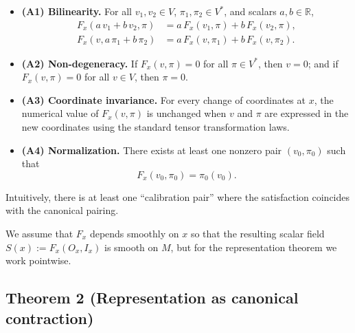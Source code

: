 \documentclass[12pt]{article}
\theoremstyle{remark}
\begin{document}
\begin{itemize}
    \item \textbf{(A1) Bilinearity.} For all $v_1, v_2 \in V$, $\pi_1, \pi_2 \in V^*$, and scalars $a, b \in \mathbb{R}$,
    \begin{align}
        F_x(a\, v_1 + b\, v_2, \pi) &= a\, F_x(v_1, \pi) + b\, F_x(v_2, \pi),\\
        F_x(v, a\, \pi_1 + b\, \pi_2) &= a\, F_x(v, \pi_1) + b\, F_x(v, \pi_2).
    \end{align}

    \item \textbf{(A2) Non-degeneracy.} If $F_x(v, \pi) = 0$ for all $\pi \in V^*$, then $v = 0$; and if $F_x(v, \pi) = 0$ for all $v \in V$, then $\pi = 0$.

    \item \textbf{(A3) Coordinate invariance.} For every change of coordinates at $x$, the numerical value of $F_x(v, \pi)$ is unchanged when $v$ and $\pi$ are expressed in the new coordinates using the standard tensor transformation laws.

    \item \textbf{(A4) Normalization.} There exists at least one nonzero pair $(v_0, \pi_0)$ such that
    \begin{equation}
        F_x(v_0, \pi_0) = \pi_0(v_0).
    \end{equation}
\end{itemize}

Intuitively, there is at least one ``calibration pair'' where the satisfaction coincides with the canonical pairing.

We assume that $F_x$ depends smoothly on $x$ so that the resulting scalar field $S(x) := F_x(O_x, I_x)$ is smooth on $M$, but for the representation theorem we work pointwise.

\subsection{Theorem 2 (Representation as canonical contraction)}
\end{document}
